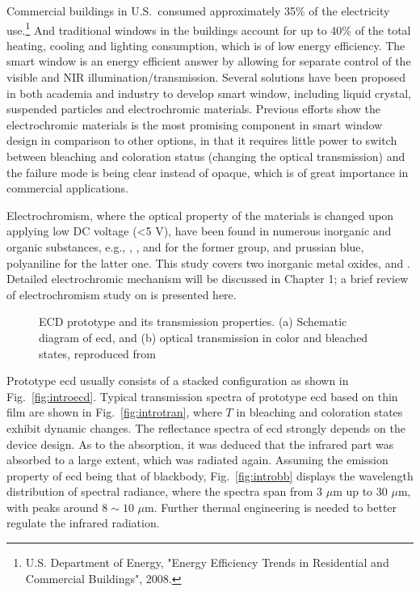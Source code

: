 Commercial buildings in U.S.\ consumed approximately 35\% of the electricity use.\footnote{U.S. Department of Energy, "Energy Efficiency Trends in Residential and Commercial Buildings", 2008.} And traditional windows in the buildings account for up to 40\% of the total heating, cooling and lighting consumption, which is of low energy efficiency. The smart window is an energy efficient answer by allowing for separate control of the visible and NIR illumination/transmission. Several solutions have been proposed in both academia and industry to develop smart window, including liquid crystal, suspended particles and electrochromic materials.\cite{Lampert1998} Previous efforts\cite{Deb2008} show the electrochromic materials is the most promising component in smart window design in comparison to other options, in that it requires little power to switch between bleaching and coloration status (changing the optical transmission) and the failure mode is being clear instead of opaque, which is of great importance in commercial applications.

Electrochromism, where the optical property of the materials is changed upon applying low DC voltage (\textless 5 V), have been found in numerous inorganic and organic substances, e.g., , , and  for the former group, and prussian blue, polyaniline for the latter one. This study covers two inorganic metal oxides,  and . Detailed electrochromic mechanism will be discussed in Chapter 1; a brief review of electrochromism study on  is presented here. 
\begin{figure}[htb]
\centering
{}\hspace{0.04\textwidth}
\caption[ECD prototype and its transmission properties]{ECD prototype and its transmission properties. (a) Schematic diagram of \gls{ecd}, and (b) optical transmission in color and bleached states, reproduced from \cite{Lampert1998}}
\label{fig:introec}
\end{figure}

Prototype \gls{ecd} usually consists of a stacked configuration as shown in Fig.~\ref{fig:introecd}. Typical transmission spectra of prototype \gls{ecd} based on  thin film are shown in Fig.~\ref{fig:introtran}\cite{Lampert1998}, where $T$ in bleaching and coloration states exhibit dynamic changes. The reflectance spectra of  \gls{ecd} strongly depends on the device design.\cite{OBrien1999} As to the absorption, it was deduced that the infrared part was absorbed to a large extent, which was radiated again. Assuming the emission property of \gls{ecd} being that of blackbody, Fig.~\ref{fig:introbb} displays the wavelength distribution of spectral radiance, where the spectra span from 3 $\mu$m up to 30 $\mu$m, with peaks around $8\sim10$ $\mu$m. Further thermal engineering is needed to better regulate the infrared radiation. 

